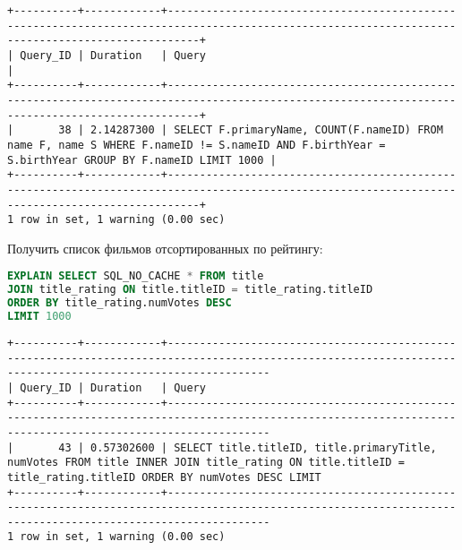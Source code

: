 \documentclass[12pt,a4paper]{article}
\begin{document}
\begin{lstlisting}[basicstyle = \tiny\ttfamily, columns = fixed]
+----------+------------+-------------------------------------------------------------------------------------------------------------------------------------------------+
| Query_ID | Duration   | Query                                                                                                                                           |
+----------+------------+-------------------------------------------------------------------------------------------------------------------------------------------------+
|       38 | 2.14287300 | SELECT F.primaryName, COUNT(F.nameID) FROM name F, name S WHERE F.nameID != S.nameID AND F.birthYear = S.birthYear GROUP BY F.nameID LIMIT 1000 |
+----------+------------+-------------------------------------------------------------------------------------------------------------------------------------------------+
1 row in set, 1 warning (0.00 sec)
\end{lstlisting}

Получить список фильмов отсортированных по рейтингу:

\begin{lstlisting}[language=SQL]
EXPLAIN SELECT SQL_NO_CACHE * FROM title
JOIN title_rating ON title.titleID = title_rating.titleID
ORDER BY title_rating.numVotes DESC
LIMIT 1000
\end{lstlisting}
\begin{lstlisting}[basicstyle = \tiny\ttfamily, columns = fixed]
+----------+------------+------------------------------------------------------------------------------------------------------------------------------------------------------------
| Query_ID | Duration   | Query                                                                                                                                                      
+----------+------------+------------------------------------------------------------------------------------------------------------------------------------------------------------
|       43 | 0.57302600 | SELECT title.titleID, title.primaryTitle, numVotes FROM title INNER JOIN title_rating ON title.titleID = title_rating.titleID ORDER BY numVotes DESC LIMIT 
+----------+------------+------------------------------------------------------------------------------------------------------------------------------------------------------------
1 row in set, 1 warning (0.00 sec)
\end{lstlisting}
\end{document}
